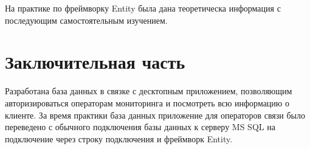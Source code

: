 На практике по фреймворку Entity  была дана теоретическа информация с последующим самостоятельным изучением.

\newpage
\section{Заключительная часть}

\vspace{0.5cm}
\hspace{0.6cm}
Разработана база данных в связке с десктопным приложением, позволяющим авторизироваться операторам мониторинга и посмотреть всю информацию о клиенте. За время практики база данных приложение для операторов связи было переведено с обычного подключения базы данных к серверу MS SQL на подключение через строку подключения и фреймворк Entity.
